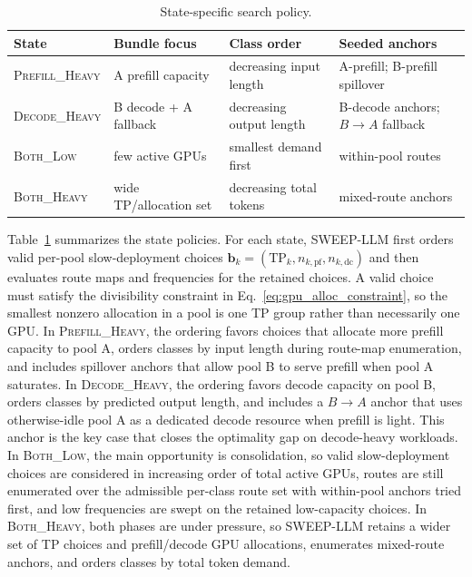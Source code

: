 \begin{table}[t]
\centering
\scriptsize
\caption{State-specific search policy.}
\label{tab:state_policy}
\vspace{-2mm}
\begin{tabular}{@{}p{}p{}p{}p{}@{}}
\toprule
State & Bundle focus & Class order & Seeded anchors \\
\midrule
\textsc{Prefill\_Heavy} & A prefill capacity & decreasing input length & A-prefill; B-prefill spillover \\
\textsc{Decode\_Heavy} & B decode + A fallback & decreasing output length & B-decode anchors; $B{\to}A$ fallback \\
\textsc{Both\_Low} & few active GPUs & smallest demand first & within-pool routes \\
\textsc{Both\_Heavy} & wide TP/allocation set & decreasing total tokens & mixed-route anchors \\
\bottomrule
\end{tabular}
\vspace{-2mm}
\end{table}

Table~\ref{tab:state_policy} summarizes the state policies.
For each state, SWEEP-LLM first orders valid per-pool slow-deployment choices $\mathbf{b}_k=(\mathrm{TP}_k,n_{k,\mathrm{pf}},n_{k,\mathrm{dc}})$ and then evaluates route maps and frequencies for the retained choices.
A valid choice must satisfy the divisibility constraint in Eq.~\ref{eq:gpu_alloc_constraint}, so the smallest nonzero allocation in a pool is one TP group rather than necessarily one GPU.
In \textsc{Prefill\_Heavy}, the ordering favors choices that allocate more prefill capacity to pool A, orders classes by input length during route-map enumeration, and includes spillover anchors that allow pool B to serve prefill when pool A saturates.
In \textsc{Decode\_Heavy}, the ordering favors decode capacity on pool B, orders classes by predicted output length, and includes a $B{\to}A$ anchor that uses otherwise-idle pool A as a dedicated decode resource when prefill is light.
This anchor is the key case that closes the optimality gap on decode-heavy workloads.
In \textsc{Both\_Low}, the main opportunity is consolidation, so valid slow-deployment choices are considered in increasing order of total active GPUs, routes are still enumerated over the admissible per-class route set with within-pool anchors tried first, and low frequencies are swept on the retained low-capacity choices.
In \textsc{Both\_Heavy}, both phases are under pressure, so SWEEP-LLM retains a wider set of TP choices and prefill/decode GPU allocations, enumerates mixed-route anchors, and orders classes by total token demand.

